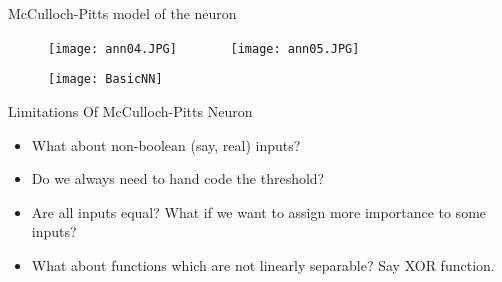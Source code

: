 \begin{frame}{McCulloch-Pitts model of the neuron}
\begin{figure}
\texttt{[image: ann04.JPG]}~~~~~~~
\texttt{[image: ann05.JPG]}
\end{figure}
\begin{figure}
\texttt{[image: BasicNN]}
\end{figure}
\end{frame}

\begin{frame}{Limitations Of McCulloch-Pitts Neuron}
\begin{itemize}
\item What about non-boolean (say, real) inputs?
\item Do we always need to hand code the threshold?
\item Are all inputs equal? What if we want to assign more importance to some inputs?
\item What about functions which are not linearly separable? Say XOR function.
\end{itemize}
\end{frame}


